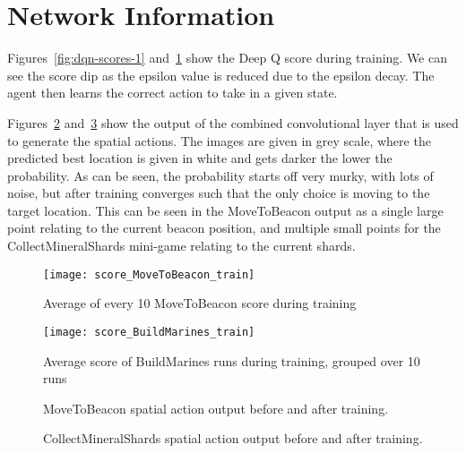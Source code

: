 \section{Network Information}

Figures~\ref{fig:dqn-scores-1} and~\ref{fig:dqn-scores-2} show the Deep Q score
during training. We can see the score dip as the epsilon value is reduced due to
the epsilon decay. The agent then learns the correct action to take in a given
state.

Figures~\ref{fig:cnn-filter1} and~\ref{fig:cnn-filter2} show the output of the
combined convolutional layer that is used to generate the spatial actions. The
images are given in grey scale, where the predicted best location is given in
white and gets darker the lower the probability. As can be seen, the
probability starts off very murky, with lots of noise, but after training
converges such that the only choice is moving to the target location. This can
be seen in the MoveToBeacon output as a single large point relating to the
current beacon position, and multiple small points for the CollectMineralShards
mini-game relating to the current shards.

\begin{figure}[h]
  \centering
  \begin{minipage}[b]{0.45\textwidth}
    \texttt{[image: score\_MoveToBeacon\_train]}
    \caption{Average of every 10 MoveToBeacon score during training}%
    \label{fig:dqn-scores-1}%
  \end{minipage}
  \hfill
  \begin{minipage}[b]{0.45\textwidth}
    \texttt{[image: score\_BuildMarines\_train]}
    \caption{Average score of BuildMarines runs during training, grouped over 10
    runs}%
    \label{fig:dqn-scores-2}
  \end{minipage}
\end{figure}

\begin{figure}[h]
    \centering
    \caption{MoveToBeacon spatial action output before and after training.}%
    \label{fig:cnn-filter1}%
\end{figure}

\begin{figure}[h]
    \centering
    \caption{CollectMineralShards spatial action output before and after training.}%
    \label{fig:cnn-filter2}%
\end{figure}

